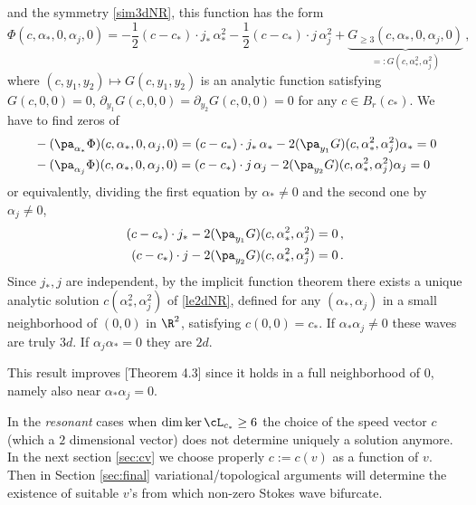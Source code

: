 \documentclass[11pt,a4paper,reqno]{article}
\numberwithin{equation}{section}
\theoremstyle{definition}
\begin{document}
and the symmetry \eqref{sim3dNR},
this function has the form 
\begin{equation}\label{exparedur}
\Phi (c, \alpha_*,0, \alpha_j,0)  =
- \frac12 (c-c_*) \cdot  j_* \, \alpha_*^2 - \frac12 
(c-c_*) \cdot j \, \alpha_j^2 + 
\underbrace{G_{\geq 3}(c,\alpha_*,0,\alpha_j,0)}_{=: G(c,\alpha_*^2,\alpha_j^2)} \, ,
\end{equation}
where 
$ (c,y_1,y_2) \mapsto G(c,y_1, y_2)$ 
is an analytic function 
satisfying $ G(c,0,0) = 0 $, 
$ \partial_{y_1} G(c,0,0) = 
\partial_{y_2} G(c,0,0) = 0 $ for any $ c \in B_r (c_*) $.  
We have to find zeros  of 
$$
\begin{aligned}
& - (\pa_{\alpha_*} \Phi)(c, \alpha_*,0,\alpha_j,0) =  
  (c-c_*) \cdot j_* \, \alpha_*  -  2 (\pa_{y_1} G) (c, \alpha_*^2, \alpha_j^2) \alpha_* = 0 \\
&  - (\pa_{\alpha_j} \Phi)(c, \alpha_*,0,\alpha_j,0) =    (c-c_*) \cdot j \, \alpha_j  -  2 (\pa_{y_2} G) (c, \alpha_*^2, \alpha_j^2) \alpha_j = 0
\end{aligned}
$$
or  equivalently, dividing the first equation by 
$ \alpha_* \neq 0 $ and the second one by   $ \alpha_j \neq 0 $,  
\begin{equation}\label{le2dNR}
    \begin{aligned}
  (c-c_*) \cdot j_*   -  2 (\pa_{y_1} G) (c, \alpha_*^2, \alpha_j^2)  = 0 \, , \\
  (c-c_*) \cdot j   -  2 (\pa_{y_2} G) (c, \alpha_*^2, \alpha_j^2)  = 0 \, .
  \end{aligned}
\end{equation}
Since $ j_*, j $ are independent,  
by the  implicit function theorem
there exists 
a  unique analytic solution 
$ c(\alpha_*^2, \alpha_j^2) $ of \eqref{le2dNR}, defined for any 
$ (\alpha_*, \alpha_j) $ in a small neighborhood of 
$ (0,0) $ in $ \R^2 $, satisfying 
$ c(0,0)  =  c_*  $.  If $ \alpha_* 
\alpha_j \neq 0 $ 
these  waves are truly $ 3 d$.   
If $ \alpha_j  \alpha_* = 0 $  they %
are $ 2 d $.



This result improves \cite{CN}[Theorem 4.3] since it holds in a full  neighborhood of $ 0 $,
namely also near   $ \alpha_* 
\alpha_j = 0 $. 

\smallskip

In the {\it resonant} cases 
when  
$ \dim \ker {\cL_{c_*}} \geq 6 $ the choice of the speed vector $ c $ (which a $ 2 $ dimensional vector) does not determine uniquely a solution anymore. 
In the next section   \ref{sec:cv} we choose properly $ c := c(v) $ 
as a function of $v $. Then  in Section \ref{sec:final} variational/topological  arguments will determine the existence of suitable  $ v $'s from which non-zero Stokes wave bifurcate.  
\end{document}
